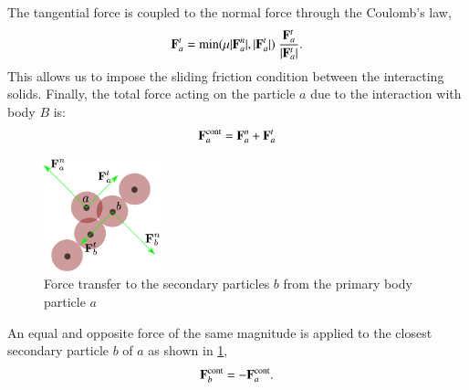 The tangential force is coupled to the normal force through the Coulomb's law,
\begin{equation}
  \label{eq:Coulomb-law}
  \mathbf{F}_{a}^{t} = \min(\mu |\mathbf{F}_{a}^{n}|, |\mathbf{F}_{a}^{t}|) \
  \frac{\mathbf{F}_{a}^{t}}{|\mathbf{F}_{a}^{t}|}.
\end{equation}
This allows us to impose the sliding friction condition between the
interacting solids. Finally, the total force acting on the particle $a$ due to
the interaction with body $B$ is:
\begin{equation}
  \label{eq:contact-force}
  \mathbf{F}_{a}^{\text{cont}} = \mathbf{F}_{a}^{n} + \mathbf{F}_{a}^{t}
\end{equation}

\begin{figure}[!htpb]
  \centering
  \includegraphics[width=0.3\textwidth]{images/csph/images/contact_force/contact_force_description_3}
  \caption{Force transfer to the secondary particles $b$ from the primary body particle $a$}
\label{fig:secondary_particle_contact_foce_transfer}
\end{figure}
An equal and opposite force of the same magnitude is applied to the closest
secondary particle $b$ of $a$ as shown in
\cref{fig:secondary_particle_contact_foce_transfer},
\begin{equation}
  \label{eq:contact-force}
  \mathbf{F}_{b}^{\text{cont}} = - \mathbf{F}_{a}^{\text{cont}}.
\end{equation}


